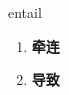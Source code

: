 
\begin{frame}
{\huge entail}
\begin{center}
\begin{enumerate}\Large
  \item \textbf{牵连}
  \item \textbf{导致}
\end{enumerate}
\end{center}
\end{frame}

